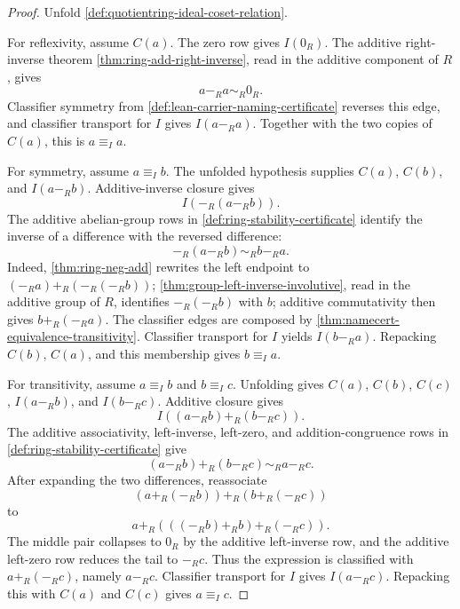 \begin{proof}
Unfold \autoref{def:quotientring-ideal-coset-relation}.

For reflexivity, assume $C(a)$. The zero row gives $I(0_R)$. The additive right-inverse theorem \autoref{thm:ring-add-right-inverse}, read in the additive component of $R$, gives
$$
a-_R a\sim_R0_R.
$$
Classifier symmetry from \autoref{def:lean-carrier-naming-certificate} reverses this edge, and classifier transport for $I$ gives $I(a-_R a)$. Together with the two copies of $C(a)$, this is $a\equiv_I a$.

For symmetry, assume $a\equiv_I b$. The unfolded hypothesis supplies $C(a)$, $C(b)$, and $I(a-_R b)$. Additive-inverse closure gives
$$
I(-_R(a-_R b)).
$$
The additive abelian-group rows in \autoref{def:ring-stability-certificate} identify the inverse of a difference with the reversed difference:
$$
-_R(a-_R b)\sim_R b-_R a.
$$
Indeed, \autoref{thm:ring-neg-add} rewrites the left endpoint to $(-_R a)+_R(-_R(-_R b))$; \autoref{thm:group-left-inverse-involutive}, read in the additive group of $R$, identifies $-_R(-_R b)$ with $b$; additive commutativity then gives $b+_R(-_R a)$. The classifier edges are composed by \autoref{thm:namecert-equivalence-transitivity}. Classifier transport for $I$ yields $I(b-_R a)$. Repacking $C(b)$, $C(a)$, and this membership gives $b\equiv_I a$.

For transitivity, assume $a\equiv_I b$ and $b\equiv_I c$. Unfolding gives $C(a)$, $C(b)$, $C(c)$, $I(a-_R b)$, and $I(b-_R c)$. Additive closure gives
$$
I((a-_R b)+_R(b-_R c)).
$$
The additive associativity, left-inverse, left-zero, and addition-congruence rows in \autoref{def:ring-stability-certificate} give
$$
(a-_R b)+_R(b-_R c)\sim_R a-_R c.
$$
After expanding the two differences, reassociate
$$
(a+_R(-_R b))+_R(b+_R(-_R c))
$$
to
$$
a+_R(((-_R b)+_R b)+_R(-_R c)).
$$
The middle pair collapses to $0_R$ by the additive left-inverse row, and the additive left-zero row reduces the tail to $-_R c$. Thus the expression is classified with $a+_R(-_R c)$, namely $a-_R c$. Classifier transport for $I$ gives $I(a-_R c)$. Repacking this with $C(a)$ and $C(c)$ gives $a\equiv_I c$.
\end{proof}

